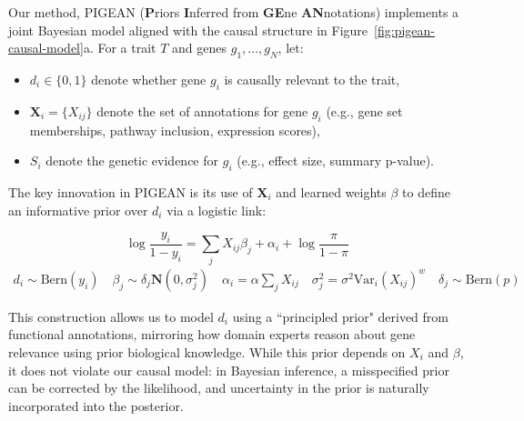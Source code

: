 \documentclass[sn-nature,lineno]{sn-jnl}%
\theoremstyle{thmstyleone}%
\theoremstyle{thmstyletwo}%
\theoremstyle{thmstylethree}%
\begin{document}

Our method, PIGEAN (\textbf{P}riors \textbf{I}nferred from \textbf{GE}ne \textbf{AN}notations) implements a joint Bayesian model aligned with the causal structure in Figure~\ref{fig:pigean-causal-model}a. For a trait $T$ and genes $g_1, \dots, g_N$, let:
\begin{itemize}
\item $d_i \in \{0,1\}$ denote whether gene $g_i$ is causally relevant to the trait,
\item $\mathbf{X}_i = \{X_{ij}\}$ denote the set of annotations for gene $g_i$ (e.g., gene set memberships, pathway inclusion, expression scores),
\item $S_i$ denote the genetic evidence for $g_i$ (e.g., effect size, summary p-value).
\end{itemize}

The key innovation in PIGEAN is its use of $\mathbf{X}_i$ and learned weights $\beta$ to define an informative prior over $d_i$ via a logistic link:

\begin{equation} \label{eq:priors}
\log\frac{y_i}{1-y_i} = \sum_j X_{ij}\beta_j + \alpha_i + \log\frac{\pi}{1-\pi}
\end{equation}
\begin{align*}
d_i \sim \text{Bern}(y_i) \quad
\beta_j \sim \delta_j\mathbf{N}(0, \sigma_j^2) \quad
\alpha_i = \alpha\sum_j X_{ij} \quad
\sigma_j^2 = \sigma^2\text{Var}_i(X_{ij})^w \quad
\delta_j \sim \text{Bern}(p) \quad
\end{align*}

This construction allows us to model $d_i$ using a ``principled prior" derived from functional annotations, mirroring how domain experts reason about gene relevance using prior biological knowledge. While this prior depends on $X_i$ and $\beta$, it does not violate our causal model: in Bayesian inference, a misspecified prior can be corrected by the likelihood, and uncertainty in the prior is naturally incorporated into the posterior.
\end{document}
